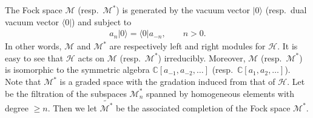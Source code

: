\documentclass[pdftex]{sigma}
\numberwithin{equation}{section}
\begin{document}
The Fock space $\mathcal{M}$ (resp.\ $\mathcal{M}^*$) is generated by the vacuum vector $|0\rangle$ (resp.\ dual vacuum vector $\langle0|$) and
subject to
\begin{align*}
a_n|0\rangle=\langle0|a_{-n},\qquad n>0.
\end{align*}
In other words, $\mathcal{M}$ and $\mathcal{M}^*$ are respectively left and right modules for $\mathcal H$.
It is easy to see that $\mathcal{H}$ acts on $\mathcal{M}$ (resp.\ $\mathcal{M}^*$) irreducibly. Moreover, $\mathcal{M}$ (resp.\ $\mathcal{M}^*$) is isomorphic to the symmetric algebra $\mathbb{C}[a_{-1},a_{-2},\dots]$ (resp.\ $\mathbb{C}[a_1,a_2,\dots]$). Note that
$\mathcal M^*$ is a graded space with the gradation induced from that of $\mathcal H$.
Let  be the filtration of the subspaces $\mathcal M^*_n$ spanned by homogeneous elements with degree $\geq n$. Then we
let $\widetilde{\mathcal{M}^*}$ be the associated completion of the Fock space $\mathcal{M}^*$.
\end{document}
